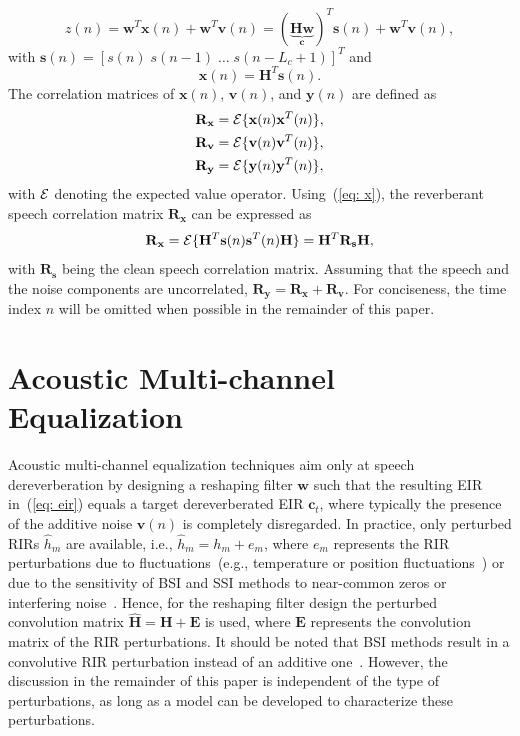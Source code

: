 \documentclass[10pt]{IEEEtran}
\begin{document}
\begin{equation}
z(n) =  \mathbf{w}^T \mathbf{x}(n) + \mathbf{w}^T \mathbf{v}(n) =  (\underbrace{\mathbf{H}\mathbf{w}}_{\mathbf{c}})^T \mathbf{s}(n) + \mathbf{w}^T \mathbf{v}(n),
\end{equation}
with $\mathbf{s}(n) = [s(n) \; s(n-1) \; \ldots \; s(n-L_c+1)]^T$ and 
\begin{equation}
\label{eq: x}
\mathbf{x}(n) = \mathbf{H}^T\mathbf{s}(n).
\end{equation}
The correlation matrices of $\mathbf{x}(n)$, $\mathbf{v}(n)$, and $\mathbf{y}(n)$ are defined as
\begin{align}
\mathbf{R}_{\mathbf{x}}  &= {\cal{E}} \{\mathbf{x}(n)\mathbf{x}^T(n) \},\\
\mathbf{R}_{\mathbf{v}} & = {\cal{E}} \{\mathbf{v}(n)\mathbf{v}^T(n) \}, \\
\mathbf{R}_{\mathbf{y}} &= {\cal{E}} \{\mathbf{y}(n)\mathbf{y}^T(n)\},
\end{align}
with ${\cal{E}}$ denoting the expected value operator.
Using~(\ref{eq: x}), the reverberant speech correlation matrix $\mathbf{R}_{\mathbf{x}}$ can be expressed as
\begin{equation}
\label{eq: rxs}
\mathbf{R}_{\mathbf{x}} = {\cal{E}} \{\mathbf{H}^T\mathbf{s}(n)\mathbf{s}^T(n)\mathbf{H} \} =  \mathbf{H}^T\mathbf{R}_{\mathbf{s}}\mathbf{H},
\end{equation}
with $\mathbf{R}_{\mathbf{s}}$ being the clean speech correlation matrix.
Assuming that the speech and the noise components are uncorrelated, $\mathbf{R}_{\mathbf{y}} = \mathbf{R}_{\mathbf{x}} + \mathbf{R}_{\mathbf{v}}$.
For conciseness, the time index $n$ will be omitted when possible in the remainder of this paper.

\section{Acoustic Multi-channel Equalization}
\label{sec: eq}
Acoustic multi-channel equalization techniques aim only at speech dereverberation by designing a reshaping filter $\mathbf{w}$ such that the resulting EIR in~(\ref{eq: eir}) equals a target dereverberated EIR $\mathbf{c}_t$, where typically the presence of the additive noise $\mathbf{v}(n)$ is completely disregarded.
{{In practice, only perturbed RIRs $\hat{h}_m$ are available, i.e., $\hat{h}_m = h_m + e_m$, where $e_m$ represents the RIR perturbations due to fluctuations~(e.g., temperature or position fluctuations~\cite{Radlovic_ITSA_2000}) or due to the sensitivity of BSI and SSI methods to near-common zeros or interfering noise~\cite{Haque_SPL_2008,Lin_ITASLP_2012,Lim_IWAENC_2014,Lim_ITASLP_2014}.
Hence, for the reshaping filter design the perturbed convolution matrix $\hat{\mathbf{H}} = \mathbf{H} + \mathbf{E}$ is used, where $\mathbf{E}$ represents the convolution matrix of the RIR perturbations.
It should be noted that BSI methods result in a convolutive RIR perturbation instead of an additive one~\cite{Thomas_ICASSP_2012}. 
However, the discussion in the remainder of this paper is independent of the type of perturbations, as long as a model can be developed to characterize these perturbations.}}
\end{document}
